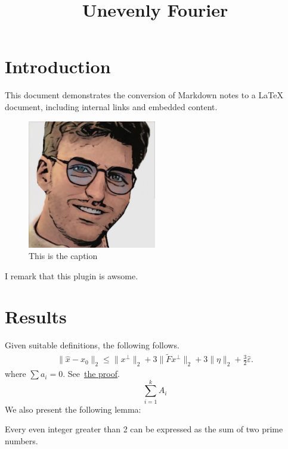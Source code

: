 \documentclass{article}
\title{Unevenly Fourier}
\begin{document}
\maketitle
{}
\section{Introduction}
\label{sec:introduction}
This document demonstrates the conversion of Markdown notes to a LaTeX document, including internal links and embedded content.
\begin{figure}[h]
\label{download.jpeg}
\centering
\includegraphics[width=0.5\textwidth]{Files/download.jpeg}
\caption{This is the caption}
\end{figure}
\begin{remark}
\label{main_note-statement}
I remark that this plugin is awsome.

\end{remark}

\section{Results}
\label{sec:results}

Given suitable definitions, the following follows.
\begin{align*}
\|\hat x - x_0\|_2
\leq \|x^\perp\|_2 + 3\|\tilde{F}x^\perp\|_2 + 3 \|\eta\|_2 + \frac{3}{2}\hat\varepsilon.
\end{align*}
where $\sum a_i = 0$. See~\hyperlink{lemma_1-proof}{the proof}.
$$\sum_{i=1}^k A_i$$
We also present the following lemma:
\begin{lemma}[lemma_1]
\label{lemma_1-statement}
Every even integer greater than 2 can be expressed as the sum of two prime numbers.
\end{lemma}
\end{document}
